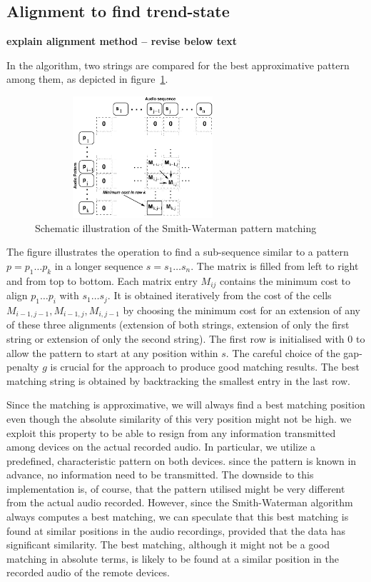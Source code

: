\documentclass{sigchi}
\begin{document}
\subsection{Alignment to find trend-state}
\textbf{explain alignment method -- revise below text}

In the algorithm, two strings are compared for the best approximative pattern among them, as depicted in figure~\ref{figurePatternMatching}.
\begin{figure}
      \includegraphics[width=8cm, height=4.5cm]{AlignmentScheme_120130_v7_STS.pdf}
     \caption{Schematic illustration of the Smith-Waterman pattern matching}
     \label{figurePatternMatching}
\end{figure}
The figure illustrates the operation to find a sub-sequence similar to a pattern $p=p_1\dots p_k$ in a longer sequence $s=s_1\dots s_n$.
The matrix is filled from left to right and from top to bottom.
Each matrix entry $M_{ij}$ contains the minimum cost to align $p_1\dots p_i$ with $s_1\dots s_j$.
It is obtained iteratively from the cost of the cells $M_{i-1,j-1},M_{i-1,j},M_{i,j-1}$ by choosing the minimum cost for an extension of any of these three alignments (extension of both strings, extension of only the first string or extension of only the second string).
The first row is initialised with $0$ to allow the pattern to start at any position within $s$.
The careful choice of the gap-penalty $g$ is crucial for the approach to produce good matching results.
The best matching string is obtained by backtracking the smallest entry in the last row.

Since the matching is approximative, we will always find a best matching position even though the absolute similarity of this very position might not be high.
we exploit this property to be able to resign from any information transmitted among devices on the actual recorded audio.
In particular, we utilize a predefined, characteristic pattern on both devices.
since the pattern is known in advance, no information need to be transmitted.
The downside to this implementation is, of course, that the pattern utilised might be very different from the actual audio recorded.
However, since the Smith-Waterman algorithm always computes a best matching, we can speculate that this best matching is found at similar positions in the audio recordings, provided that the data has significant similarity.
The best matching, although it might not be a good matching in absolute terms, is likely to be found at a similar position in the recorded audio of the remote devices.
\end{document}
